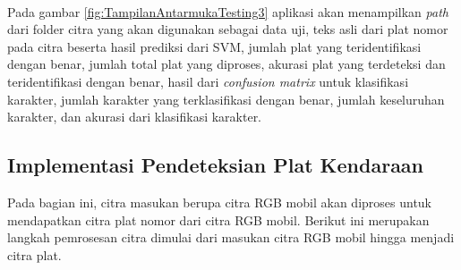 \\
\noindent Pada gambar \ref{fig:TampilanAntarmukaTesting3} aplikasi akan menampilkan \textit{path} dari folder citra yang akan digunakan sebagai data uji, teks asli dari plat nomor pada citra beserta hasil prediksi dari SVM, jumlah plat yang teridentifikasi dengan benar, jumlah total plat yang diproses, akurasi plat yang terdeteksi dan teridentifikasi dengan benar, hasil dari \textit{confusion matrix} untuk klasifikasi karakter, jumlah karakter yang terklasifikasi dengan benar, jumlah keseluruhan karakter, dan akurasi dari klasifikasi karakter.\\

\subsection{Implementasi Pendeteksian Plat Kendaraan}
\noindent Pada bagian ini, citra masukan berupa citra RGB mobil akan diproses untuk mendapatkan citra plat nomor dari citra RGB mobil. Berikut ini merupakan langkah pemrosesan citra dimulai dari masukan citra RGB mobil hingga menjadi citra plat.
